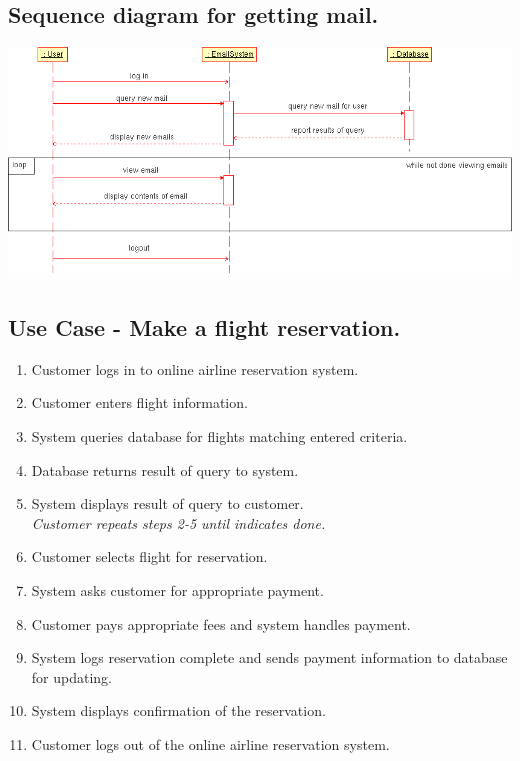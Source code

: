\documentclass{article}[12pt]
\begin{document}
  \subsection*{Sequence diagram for getting mail.}
    \includegraphics[scale=0.45]{get_mail.png}

  \subsection*{Use Case - Make a flight reservation.}
    \begin{enumerate}
      \item Customer logs in to online airline reservation system.
      \item Customer enters flight information.
      \item System queries database for flights matching entered criteria.
      \item Database returns result of query to system.
      \item System displays result of query to customer. \\
            \emph{Customer repeats steps 2-5 until indicates done.}
      \item Customer selects flight for reservation.
      \item System asks customer for appropriate payment.
      \item Customer pays appropriate fees and system handles payment.
      \item System logs reservation complete and sends payment information to database for updating.
      \item System displays confirmation of the reservation.
      \item Customer logs out of the online airline reservation system.
    \end{enumerate} 
\end{document}
